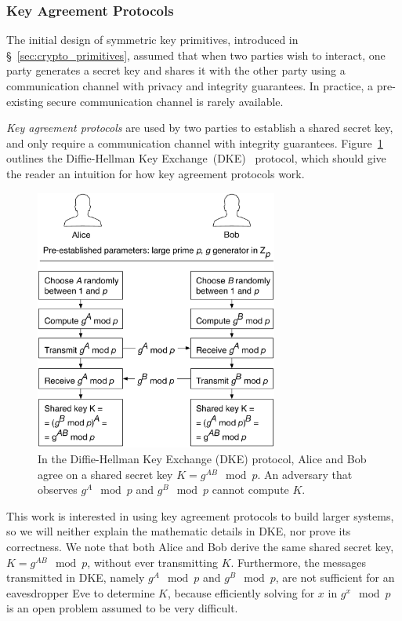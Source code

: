 \subsubsection{Key Agreement Protocols}
\label{sec:key_agreement}

The initial design of symmetric key primitives, introduced in
\S~\ref{sec:crypto_primitives}, assumed that when two parties wish to interact,
one party generates a secret key and shares it with the other party using a
communication channel with privacy and integrity guarantees. In practice, a
pre-existing secure communication channel is rarely available.

\textit{Key agreement protocols} are used by two parties to establish a shared
secret key, and only require a communication channel with integrity guarantees.
Figure~\ref{fig:dh_key_exchange} outlines the Diffie-Hellman Key
Exchange~(DKE)~\cite{diffie1976keyexchange} protocol, which should give the
reader an intuition for how key agreement protocols work.

\begin{figure}[hbt]
  \centering
  \includegraphics[width=80mm]{figures/dh_key_exchange.pdf}
  \caption{
    In the Diffie-Hellman Key Exchange (DKE) protocol, Alice and Bob
    agree on a shared secret key $K = g^{AB} \mod p$. An adversary that
    observes $g^{A} \mod p$ and $g^{B} \mod p$ cannot compute $K$.
  }
  \label{fig:dh_key_exchange}
\end{figure}

This work is interested in using key agreement protocols to build larger
systems, so we will neither explain the mathematic details in DKE, nor prove
its correctness. We note that both Alice and Bob derive the same shared secret
key, $K = g^{AB} \mod p$, without ever transmitting $K$. Furthermore, the
messages transmitted in DKE, namely $g^{A} \mod p$ and $g^{B} \mod p$, are not
sufficient for an eavesdropper Eve to determine $K$, because efficiently
solving for $x$ in $g^{x} \mod p$ is an open problem assumed to be very
difficult.

